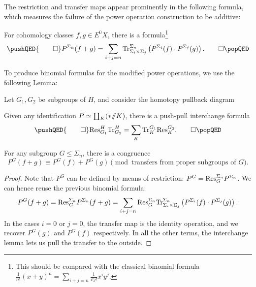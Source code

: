 The restriction and transfer maps appear prominently in the following formula, which measures the failure of the power operation construction to be additive:
\begin{lemma}
For cohomology classes \(f, g \in E^0 X\), there is a formula\footnote{This should be compared with the classical binomial formula \(\frac{1}{n!} (x + y)^n = \sum_{i+j = n} \frac{1}{i!j!} x^i y^j\).}
\[\pushQED{\qed}
P^{\Sigma_n}(f + g) = \sum_{i + j = n} \Tr_{\Sigma_i \times \Sigma_j}^{\Sigma_n}\left(P^{\Sigma_i}(f) \cdot P^{\Sigma_j}(g)\right). \qedhere
\popQED\]
\end{lemma}

\noindent To produce binomial formulas for the modified power operations, we use the following Lemma:

\begin{lemma}
Let \(G_1, G_2\) be subgroups of \(H\), and consider the homotopy pullback diagram
\begin{center}
\end{center}
Given any identification \(P \simeq \coprod_K (* /\!\!/ K)\), there is a push-pull interchange formula
\[\pushQED{\qed}
\Res_{G_1}^H \Tr_{G_2}^H = \sum_K \Tr^{G_1}_K \Res_K^{G_2}. \qedhere
\popQED\]
\end{lemma}

\begin{corollary}
For any subgroup \(G \le \Sigma_n\), there is a congruence \[P^G(f + g) \equiv P^G(f) + P^G(g) \pmod{\text{transfers from proper subgroups of \(G\)}}.\]
\end{corollary}
\begin{proof}
Note that \(P^G\) can be defined by means of restriction: \(P^G = \mathrm{Res}^{\Sigma_n}_G P^{\Sigma_n}\).  We can hence reuse the previous binomial formula: \[P^G(f + g) = \mathrm{Res}^{\Sigma_n}_G P^{\Sigma_n}(f + g) = \sum_{i+j = n} \mathrm{Res}^{\Sigma_n}_G \mathrm{Tr}_{\Sigma_i \times \Sigma_j}^{\Sigma_n}\left(P^{\Sigma_i}(f) \cdot P^{\Sigma_j}(g)\right).\]  In the cases \(i = 0\) or \(j = 0\), the transfer map is the identity operation, and we recover \(P^G(g)\) and \(P^G(f)\) respectively.  In all the other terms, the interchange lemma lets us pull the transfer to the outside.
\end{proof}

